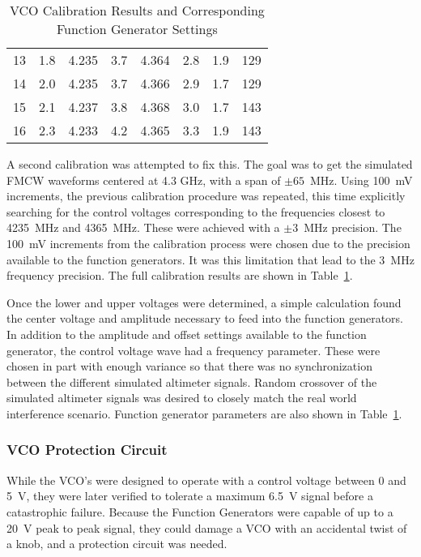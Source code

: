 \begin{table}[]
\begin{tabular}{@{}c|cc|cc|ccc@{}}
13  & 1.8      & 4.235           & 3.7      & 4.364           & 2.8             & 1.9                & 129                    \\
14  & 2.0      & 4.235           & 3.7      & 4.366           & 2.9             & 1.7                & 129                    \\
15  & 2.1      & 4.237           & 3.8      & 4.368           & 3.0             & 1.7                & 143                    \\
16  & 2.3      & 4.233           & 4.2      & 4.365           & 3.3             & 1.9                & 143                   
\end{tabular}
\caption{VCO Calibration Results and Corresponding Function Generator Settings}
\label{tab:VCO_Cal}
\end{table}


A second calibration was attempted to fix this. The goal was to get the simulated FMCW waveforms centered at 4.3 GHz, with a span of $\pm65$~MHz. Using 100~mV increments, the previous calibration procedure was repeated, this time explicitly searching for the control voltages corresponding to the frequencies closest to 4235~MHz and 4365~MHz. These were achieved with a $\pm3$~MHz precision. The 100~mV increments from the calibration process were chosen due to the precision available to the function generators. It was this limitation that lead to the 3~MHz frequency precision. The full calibration results are shown in Table~\ref{tab:VCO_Cal}.

Once the lower and upper voltages were determined, a simple calculation found the center voltage and amplitude necessary to feed into the function generators. In addition to the amplitude and offset settings available to the function generator, the control voltage wave had a frequency parameter. These were chosen in part with enough variance so that there was no synchronization between the different simulated altimeter signals. Random crossover of the simulated altimeter signals was desired to closely match the real world interference scenario. Function generator parameters are also shown in Table~\ref{tab:VCO_Cal}.

\subsubsection{VCO Protection Circuit}
While the VCO's were designed to operate with a control voltage between 0 and 5~V, they were later verified to tolerate a maximum 6.5~V signal before a catastrophic failure. Because the Function Generators were capable of up to a 20~V peak to peak signal, they could damage a VCO with an accidental twist of a knob, and a protection circuit was needed.

